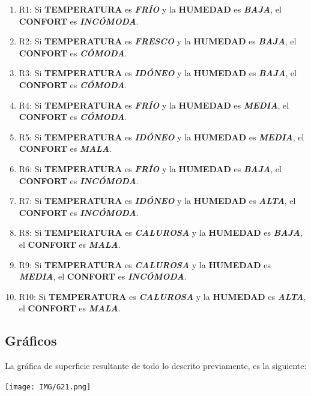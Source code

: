 \documentclass[11pt, letterpaper]{article}
\begin{document}
	\begin{enumerate}
		\item R1: Si \textbf{TEMPERATURA} es \textbf{\textit{FRÍO}} y la \textbf{HUMEDAD} es \textbf{\textit{BAJA}}, el \textbf{CONFORT} es \textbf{\textit{INCÓMODA}}.
		\item R2: Si \textbf{TEMPERATURA} es \textbf{\textit{FRESCO}} y la \textbf{HUMEDAD} es \textbf{\textit{BAJA}}, el \textbf{CONFORT} es \textbf{\textit{CÓMODA}}.
		\item R3: Si \textbf{TEMPERATURA} es \textbf{\textit{IDÓNEO}} y la \textbf{HUMEDAD} es \textbf{\textit{BAJA}}, el \textbf{CONFORT} es \textbf{\textit{CÓMODA}}.
		\item R4: Si \textbf{TEMPERATURA} es \textbf{\textit{FRÍO}} y la \textbf{HUMEDAD} es \textbf{\textit{MEDIA}}, el \textbf{CONFORT} es \textbf{\textit{CÓMODA}}.
		\item R5: Si \textbf{TEMPERATURA} es \textbf{\textit{IDÓNEO}} y la \textbf{HUMEDAD} es \textbf{\textit{MEDIA}}, el \textbf{CONFORT} es \textbf{\textit{MALA}}.
		\item R6: Si \textbf{TEMPERATURA} es \textbf{\textit{FRÍO}} y la \textbf{HUMEDAD} es \textbf{\textit{BAJA}}, el \textbf{CONFORT} es \textbf{\textit{INCÓMODA}}.
		\item R7: Si \textbf{TEMPERATURA} es \textbf{\textit{IDÓNEO}} y la \textbf{HUMEDAD} es \textbf{\textit{ALTA}}, el \textbf{CONFORT} es \textbf{\textit{INCÓMODA}}.
		\item R8: Si \textbf{TEMPERATURA} es \textbf{\textit{CALUROSA}} y la \textbf{HUMEDAD} es \textbf{\textit{BAJA}}, el \textbf{CONFORT} es \textbf{\textit{MALA}}.
		\item R9: Si \textbf{TEMPERATURA} es \textbf{\textit{CALUROSA}} y la \textbf{HUMEDAD} es \textbf{\textit{MEDIA}}, el \textbf{CONFORT} es \textbf{\textit{INCÓMODA}}.
		\item R10: Si \textbf{TEMPERATURA} es \textbf{\textit{CALUROSA}} y la \textbf{HUMEDAD} es \textbf{\textit{ALTA}}, el \textbf{CONFORT} es \textbf{\textit{MALA}}.
	\end{enumerate}
	
	\subsection{Gráficos}
	
	La gráfica de superficie resultante de todo lo descrito previamente, es la siguiente:
	
	\texttt{[image: IMG/G21.png]}
	
\end{document}
